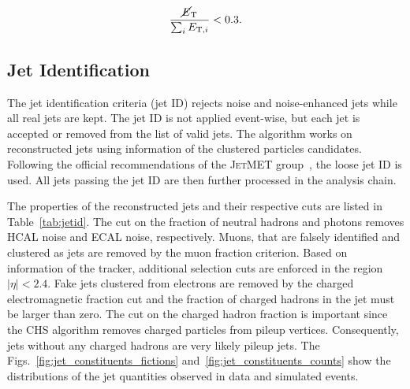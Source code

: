 \begin{equation}
    \frac{\cancel{E}_{\mathrm{T}}}{\sum_i E_{\mathrm{T},i}} < 0.3.
\end{equation}

\subsection{Jet Identification}

The jet identification criteria (jet ID) rejects noise and noise-enhanced jets
while all real jets are kept. The jet ID is not applied event-wise, but each jet
is accepted or removed from the list of valid jets. The algorithm works on
reconstructed jets using information of the clustered particles candidates.
Following the official recommendations of the \textsc{JetMET}
group~\cite{jetmet:jetid}, the loose jet ID is used. All jets passing the jet ID
are then further processed in the analysis chain. 

The properties of the reconstructed jets and their respective cuts are listed in
Table~\ref{tab:jetid}. The cut on the fraction of neutral hadrons and photons
removes HCAL noise and ECAL noise, respectively. Muons, that are falsely
identified and clustered as jets are removed by the muon fraction criterion.
Based on information of the tracker, additional selection cuts are enforced in
the region $|\eta| < 2.4$. Fake jets clustered from electrons are removed by the
charged electromagnetic fraction cut and the fraction of charged hadrons in the
jet must be larger than zero. The cut on the charged hadron fraction is
important since the CHS algorithm removes charged particles from pileup
vertices. Consequently, jets without any charged hadrons are very likely pileup
jets. The Figs.~\ref{fig:jet_constituents_fictions}
and~\ref{fig:jet_constituents_counts} show the distributions of the jet
quantities observed in data and simulated events.

